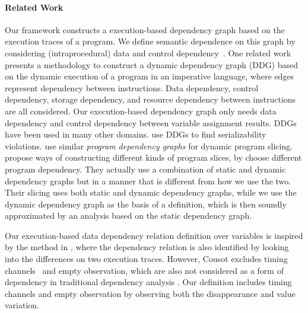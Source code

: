  \paragraph*{Related Work}
 {
Our framework constructs a execution-based dependency graph based on the execution traces of a program. We define semantic dependence on this graph by considering (intraprocedural) data and control dependency~\cite{bilardi1996framework,cytron1991efficiently,pollock1989incremental}.    
One related work  
\cite{austin1992dynamic} presents a methodology to construct a dynamic dependency graph (DDG) based on the dynamic execution of a program in an imperative language, where edges represent dependency between instructions. Data dependency, control dependency, storage dependency, and resource dependency between instructions are all considered. Our execution-based dependency graph only needs data dependency and control dependency between variable assignment results. 
%
DDGs have been used in many other domains. \cite{nagar2018automated} use DDGs to find serializability violations. \cite{hammer2006dynamic} use similar \emph{program dependency graphs} \cite{ferrante1987program} for dynamic program slicing.
\cite{mastroeni2008data} propose ways of constructing different kinds of program slices, by choose different program dependency. 
They actually use a combination of  
static and dynamic dependency graphs but in a manner that is different from how we use the two. Their slicing uses both static and dynamic dependency graphs, while we use the dynamic dependency graph as the basis of a definition, which is then soundly approximated by an analysis based on the static dependency graph.}

{Our execution-based data dependency relation definition over variables 
is inspired by the method in \cite{Cousot19a}, where the dependency relation is also identified by looking into the differences on two execution traces. 
However, Cousot excludes timing channels~\cite{SabelfeldM03} and empty observation, which are also not considered as a form of dependency in traditional dependency analysis \cite{DenningD77}.
Our definition includes timing channels and empty observation by observing both the disappearance and value variation.
}
